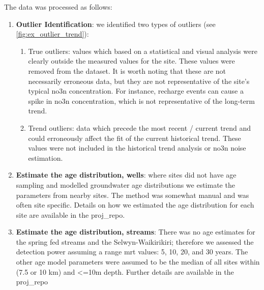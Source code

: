 The data was processed as follows:
\begin{enumerate}
    \item \textbf{Outlier Identification}: we identified two types of outliers (see \autoref{fig:ex_outlier_trend}):
    \begin{enumerate}
        \item  True outliers: values which based on a statistical and visual analysis were clearly outside the measured values for the site. These values were removed from the dataset. It is worth noting that these  are not necessarily erroneous data, but they are not representative of the site's typical \gls{no3n} concentration. For instance, recharge events can cause a spike in \gls{no3n} concentration, which is not representative of the long-term trend.
        \item Trend outliers: data which precede the most recent / current trend and could erroneously affect the fit of the current historical trend. These values were not included in the historical trend analysis or \gls{no3n} noise estimation.
    \end{enumerate}
    \item \textbf{Estimate the age distribution, wells}: where sites did not have age sampling and modelled groundwater age distributions we estimate the parameters from nearby sites. The method was somewhat manual and was often site specific. Details on how we estimated the age distribution for each site are available in the \gls{proj_repo}.
    \item \textbf{Estimate the age distribution, streams}: There was no age estimates for the spring fed streams and the Selwyn-Waikirikiri; therefore we assessed the detection power assuming a range \gls{mrt} values: 5, 10, 20, and 30 years. The other age model parameters were assumed to be the median of all sites within (7.5 or 10 km) and <=10m depth. Further details are available in the \gls{proj_repo}
\end{enumerate}


\begin{landscape}
\end{landscape}


